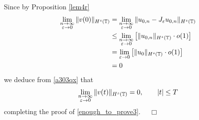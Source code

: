 Since by Proposition \ref{lem4r} 
\begin{equation*}
	\begin{split}
	\lim_{\substack{n \to \infty \\ \varepsilon \to 0} }
	\|v(0)\|_{H^s(\mathbb{T})}
	& = \lim_{\substack{n \to \infty \\ \varepsilon \to 0} }
	\|u_{0,n} - J_\varepsilon u_{0,n} \|_{H^s(\mathbb{T})} 
	\\
	& \le  \lim_{\substack{n \to \infty \\ \varepsilon \to 0}}
	\left [ \|u_{0,n}\|_{H^s(\mathbb{T})} \cdot o(1) \right ]
	\\
	& = \lim_{\varepsilon \to 0} \left [ \|u_0\|_{H^s(\mathbb{T})} \cdot o(1) \right ]
	\\
	& = 0
	\end{split}
\end{equation*}
we deduce from \eqref{a303qx} that
\begin{equation*}
	\begin{split}
		\lim_{\substack{n \to \infty \\ \varepsilon \to 0}} \|v(t)\|_{H^s(\mathbb{T})} = 0, \qquad |t| \le T
	\end{split}
\end{equation*}
completing the proof of \eqref{enough_to_prove3}. $\quad \Box$
%
%
%
